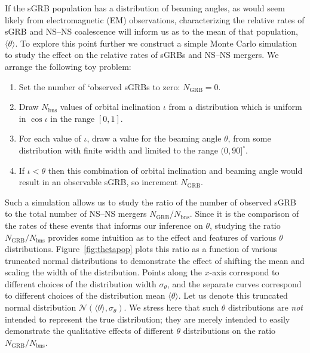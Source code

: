 \documentclass[twocolumn,nofootinbib]{revtex4-1}
\newcommand{\BNS}{\ac{NS}--\ac{NS}\xspace}
\def\electro#1{electromagnetic#1 (EM#1)\gdef\electro{EM}}
\begin{document}
If the \ac{sGRB} population has a distribution of beaming angles, as would seem likely from \electro{} observations, characterizing the relative rates of \ac{sGRB} and \BNS coalescence will inform us as to the mean of that population, $\langle \theta \rangle$.
To explore this point further we construct a simple Monte Carlo simulation to study the effect on the relative rates of \acp{sGRB} and \BNS mergers.
We arrange the following toy problem:
%
\begin{enumerate}
    \item Set the number of `observed \acp{sGRB} to zero: $N_{\mathrm{GRB}}=0$.
    \item Draw $N_{\mathrm{bns}}$ values of orbital inclination $\iota$ from a distribution which is uniform in $\cos \iota$ in the range $[0,1]$.
    \item For each value of $\iota$, draw a value for the beaming angle $\theta$, from some distribution with finite width and limited to the range $(0,90]^{\circ}$.
    \item If $\iota<\theta$ then this combination of orbital inclination and beaming angle would result in an observable \ac{sGRB}, so increment $N_{\mathrm{GRB}}$.
\end{enumerate}
%
Such a simulation allows us to study the ratio of the number of observed \ac{sGRB} to the total number of \BNS mergers $N_{\mathrm{GRB}}/N_{\mathrm{bns}}$.
Since it is the comparison of the rates of these events that informs our inference on $\theta$,  studying the ratio $N_{\mathrm{GRB}}/N_{\mathrm{bns}}$ provides some intuition as to the effect and features of various $\theta$ distributions.
Figure~\ref{fig:thetapop} plots this ratio as a function of various truncated normal distributions to demonstrate the effect of shifting the mean and scaling the width of the distribution.
Points along the $x$-axis correspond to different choices of the distribution width $\sigma_{\theta}$, and the separate curves correspond to different choices of the distribution mean $\langle \theta \rangle$.
Let us denote this truncated normal distribution ${\mathcal N}(\langle \theta \rangle, \sigma_{\theta})$.
We stress here that such $\theta$ distributions are \emph{not} intended to represent the true distribution; they are merely intended to easily demonstrate the qualitative effects of different $\theta$ distributions on the ratio $N_{\mathrm{GRB}}/N_{\mathrm{bns}}$.
\end{document}
